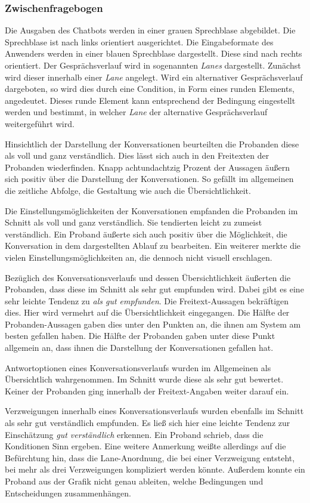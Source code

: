 \subsubsection{Zwischenfragebogen}
Die Ausgaben des Chatbots werden in einer grauen Sprechblase abgebildet. Die Sprechblase ist nach links orientiert ausgerichtet. Die Eingabeformate des Anwenders werden in einer blauen Sprechblase dargestellt. Diese sind nach rechts orientiert. Der Gesprächsverlauf wird in sogenannten \emph{Lanes} dargestellt. Zunächst wird dieser innerhalb einer \emph{Lane} angelegt. Wird ein alternativer Gesprächsverlauf dargeboten, so wird dies durch eine Condition, in Form eines runden Elements, angedeutet. Dieses runde Element kann entsprechend der Bedingung eingestellt werden und bestimmt, in welcher \emph{Lane} der alternative Gesprächsverlauf weitergeführt wird. 

Hinsichtlich der Darstellung der Konversationen beurteilten die Probanden diese als voll und ganz verständlich. Dies lässt sich auch in den Freitexten der Probanden wiederfinden. Knapp achtundachtzig Prozent der Aussagen äußern sich positiv über die Darstellung der Konversationen. So gefällt im allgemeinen die zeitliche Abfolge, die Gestaltung wie auch die Übersichtlichkeit. 

Die Einstellungsmöglichkeiten der Konversationen empfanden die Probanden im Schnitt als voll und ganz verständlich. Sie tendierten leicht zu zumeist verständlich. Ein Proband äußerte sich auch positiv über die Möglichkeit, die Konversation in dem dargestellten Ablauf zu bearbeiten. Ein weiterer merkte die vielen Einstellungsmöglichkeiten an, die dennoch nicht visuell erschlagen.

Bezüglich des Konversationsverlaufs und dessen Übersichtlichkeit äußerten die Probanden, dass diese im Schnitt als sehr gut empfunden wird. Dabei gibt es eine sehr leichte Tendenz zu \emph{als gut empfunden}. Die Freitext-Aussagen bekräftigen dies. Hier wird vermehrt auf die Übersichtlichkeit eingegangen. Die Hälfte der Probanden-Aussagen gaben dies unter den Punkten an, die ihnen am System am besten gefallen haben. Die Hälfte der Probanden gaben unter diese Punkt allgemein an, dass ihnen die Darstellung der Konversationen gefallen hat.

Antwortoptionen eines Konversationsverlaufs wurden im Allgemeinen als Übersichtlich wahrgenommen. Im Schnitt wurde diese als sehr gut bewertet. Keiner der Probanden ging innerhalb der Freitext-Angaben weiter darauf ein.

Verzweigungen innerhalb eines Konversationsverlaufs wurden ebenfalls im Schnitt als sehr gut verständlich empfunden. Es ließ sich hier eine leichte Tendenz zur Einschätzung \emph{gut verständlich} erkennen. Ein Proband schrieb, dass die Konditionen Sinn ergeben. Eine weitere Anmerkung weißte allerdings auf die Befürchtung hin, dass die Lane-Anordnung, die bei einer Verzweigung entsteht, bei mehr als drei Verzweigungen kompliziert werden könnte. Außerdem konnte ein Proband aus der Grafik nicht genau ableiten, welche Bedingungen und Entscheidungen zusammenhängen. 

